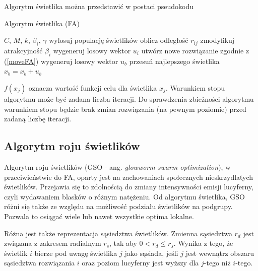 \documentclass[11pt,a4paper,twoside]{article}
\begin{document}
Algorytm świetlika można przedstawić w postaci pseudokodu

\begin{algorithm}[ht]
\caption{Algorytm świetlika (FA)}
\label{FA}
\begin{algorithmic}%
\Require $C$, $M$, $k$, $\beta_{i}$, $\gamma$
	\State wylosuj populację świetlików
				\State oblicz odległość $r_{ij}$
				\State zmodyfikuj atrakcyjność $\beta_{i}$
				\State wygeneruj losowy wektor $u_{i}$
				\State utwórz nowe rozwiązanie zgodnie z (\ref{moveFA})
    		\EndIf
		\EndFor
	\EndFor	
	\State wygeneruj losowy wektor $u_{b}$
	\State przesuń najlepszego świetlika $x_{b} = x_{b} + u_{b}$
	\EndWhile	
\end{algorithmic}
\end{algorithm}

$f(x_{j})$ oznacza wartość funkcji celu dla świetlika $x_{j}$. Warunkiem stopu algorytmu może być zadana liczba iteracji. Do sprawdzenia zbieżności algorytmu warunkiem stopu będzie brak zmian rozwiązania (na pewnym poziomie) przed zadaną liczbę iteracji.

\clearpage
\subsection{Algorytm roju świetlików}
Algorytm roju świetlików (GSO - ang. \textit{glowworm swarm optimization}), w przeciwieństwie do FA, oparty jest na zachowaniach społecznych nieskrzydlatych świetlików. Przejawia się to zdolnością do zmiany intensywności emisji lucyferny, czyli wydawaniem blasków o różnym natężeniu. Od algorytmu świetlika, GSO różni się także ze względu na możliwość podziału świetlików na podgrupy. Pozwala to osiągać wiele lub nawet wszystkie optima lokalne.

Różna jest także reprezentacja sąsiedztwa świetlików. Zmienna sąsiedztwa $r_{d}$ jest związana z zakresem radialnym $r_{s}$, tak aby $0 < r_{d} \leq r_{s}$. Wynika z tego, że świetlik $i$ bierze pod uwagę świetlika $j$ jako sąsiada, jeśli $j$ jest wewnątrz obszaru sąsiedztwa rozwiązania $i$ oraz poziom lucyferny jest wyższy dla $j$-tego niż $i$-tego.
\end{document}
